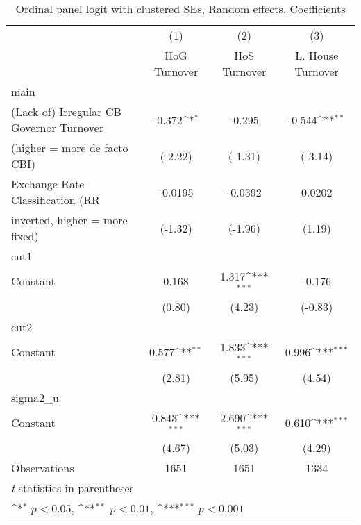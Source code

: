\begin{table}[htbp]\centering
\def\sym#1{\ifmmode^{#1}\else\(^{#1}\)\fi}
\caption{Ordinal panel logit with clustered SEs, Random effects, Coefficients \label{coeffordLogDF}}
\begin{tabular}{l*{3}{c}}
\toprule
                                        &\multicolumn{1}{c}{(1)}&\multicolumn{1}{c}{(2)}&\multicolumn{1}{c}{(3)}\\
                                        &\multicolumn{1}{c}{HoG Turnover}&\multicolumn{1}{c}{HoS Turnover}&\multicolumn{1}{c}{L. House Turnover}\\
\midrule
main                                    &                  &                  &                  \\
(Lack of) Irregular CB Governor Turnover&   -0.372\sym{*}  &   -0.295         &   -0.544\sym{**} \\
(higher = more de facto CBI)            &  (-2.22)         &  (-1.31)         &  (-3.14)         \\
\addlinespace
Exchange Rate Classification (RR        &  -0.0195         &  -0.0392         &   0.0202         \\
inverted, higher = more fixed)          &  (-1.32)         &  (-1.96)         &   (1.19)         \\
\midrule
cut1                                    &                  &                  &                  \\
Constant                                &    0.168         &    1.317\sym{***}&   -0.176         \\
                                        &   (0.80)         &   (4.23)         &  (-0.83)         \\
\midrule
cut2                                    &                  &                  &                  \\
Constant                                &    0.577\sym{**} &    1.833\sym{***}&    0.996\sym{***}\\
                                        &   (2.81)         &   (5.95)         &   (4.54)         \\
\midrule
sigma2\_u                                &                  &                  &                  \\
Constant                                &    0.843\sym{***}&    2.690\sym{***}&    0.610\sym{***}\\
                                        &   (4.67)         &   (5.03)         &   (4.29)         \\
\midrule
Observations                            &     1651         &     1651         &     1334         \\
\bottomrule
\multicolumn{4}{l}{\footnotesize \textit{t} statistics in parentheses}\\
\multicolumn{4}{l}{\footnotesize \sym{*} \(p<0.05\), \sym{**} \(p<0.01\), \sym{***} \(p<0.001\)}\\
\end{tabular}
\end{table}
